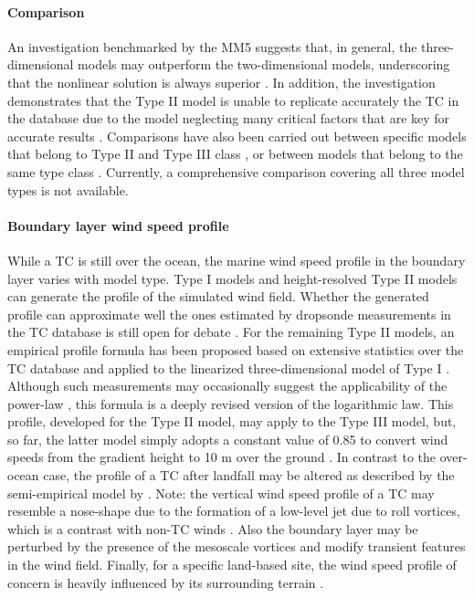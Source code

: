 \paragraph{Comparison} An investigation benchmarked by the MM5 \citep{liu1997multiscale} suggests that, in general, the three-dimensional models may outperform the two-dimensional models, underscoring that the nonlinear solution is always superior \citep{kepert2010slab-i,kepert2010slab-ii, kepert2014reply}. In addition, the investigation demonstrates that the Type II model is unable to replicate accurately the TC in the database due to the model neglecting many critical factors that are key for accurate results \citep{kepert2010slab-i}. Comparisons have also been carried out between specific models that belong to Type II and Type III class \citep{smith2008critique}, or between models that belong to the same type class \citep{snaiki2017linear, wills2000review}. Currently, a comprehensive comparison covering all three model types is not available. 

\paragraph{Boundary layer wind speed profile} While a TC is still over the ocean, the marine wind speed profile in the boundary layer varies with model type. Type I models and height-resolved Type II models can generate the profile of the simulated wind field. Whether the generated profile can approximate well the ones estimated by dropsonde measurements in the TC database is still open for debate \citep{kepert2001dynamics-ii, kepert2011choosing, kepert2013how, montgomery2014comments, smith1968surface}. For the remaining Type II models, an empirical profile formula has been proposed based on extensive statistics over the TC database and applied to the linearized three-dimensional model of Type I \citep{vickery2009hurricane-b}. Although such measurements may occasionally suggest the applicability of the power-law \citep{song2016characteristics}, this formula is a deeply revised version of the logarithmic law. This profile, developed for the Type II model, may apply to the Type III model, but, so far, the latter model simply adopts a constant value of 0.85 to convert wind speeds from the gradient height to 10 m over the ground \citep{chavas2015model}. In contrast to the over-ocean case, the profile of a TC after landfall may be altered as described by the semi-empirical model by \citet{snaiki2018semiempirical}. Note: the vertical wind speed profile of a TC may resemble a nose-shape due to the formation of a low-level jet due to roll vortices, which is a contrast with non-TC winds \citep{li2015comparative, li2019observed}. Also the boundary layer may be perturbed by the presence of the mesoscale vortices and modify transient features in the wind field. Finally, for a specific land-based site, the wind speed profile of concern is heavily influenced by its surrounding terrain \citep{huang2013prediction}.

